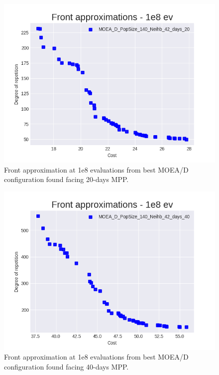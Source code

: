 \begin{figure}[H]
  \centering
  \includegraphics[width=1.0\linewidth]{../experiments/plots/fronts/20_days/MOEA_D_PopSize_140_Neihb_42_days_20_12.png}
\caption{Front approximation at 1e8 evaluations from best MOEA/D configuration found facing 20-days MPP.}
\label{fig:front_comp_3}
\end{figure}


\begin{figure}[H]
  \centering
  \includegraphics[width=1.0\linewidth]{../experiments/plots/fronts/40_days/MOEA_D_PopSize_140_Neihb_42_days_40_10.png}
\caption{Front approximation at 1e8 evaluations from best MOEA/D configuration found facing 40-days MPP.}
\label{fig:front_comp_4}
\end{figure}

% 
%